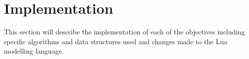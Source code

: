 \chapter{Implementation}

This section will describe the implementation of each of the objectives
including specific algorithms and data structures used and changes made to the
Lua modelling language.











